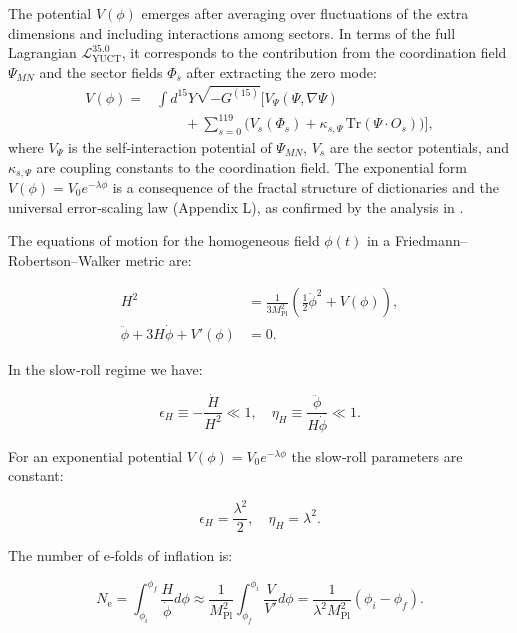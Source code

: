 \documentclass[12pt]{article}
\theoremstyle{remark}
\newcommand{\Mpl}{M_{\mathrm{Pl}}}
\newcommand{\ninf}{N_{\mathrm{e}}}
\begin{document}
	The potential $V(\phi)$ emerges after averaging over fluctuations of the extra dimensions and including interactions among sectors. In terms of the full Lagrangian $\mathcal{L}_{\text{YUCT}}^{35.0}$, it corresponds to the contribution from the coordination field $\Psi_{MN}$ and the sector fields $\Phi_s$ after extracting the zero mode:
	\begin{align}
		V(\phi) = &\int d^{15}Y \sqrt{-G^{(15)}} \Big[ V_{\Psi}(\Psi,\nabla\Psi) \nonumber\\
		&\qquad + \sum_{s=0}^{119} \big( V_s(\Phi_s) + \kappa_{s,\Psi}\,\mathrm{Tr}(\Psi\cdot O_s) \big) \Big],
	\end{align}
	where $V_{\Psi}$ is the self‑interaction potential of $\Psi_{MN}$, $V_s$ are the sector potentials, and $\kappa_{s,\Psi}$ are coupling constants to the coordination field. The exponential form $V(\phi)=V_0 e^{-\lambda\phi}$ is a consequence of the fractal structure of dictionaries and the universal error‑scaling law (Appendix L), as confirmed by the analysis in \cite{Yakushev2026}.
	
	The equations of motion for the homogeneous field $\phi(t)$ in a Friedmann–Robertson–Walker metric are:
	
	\begin{align}
		H^2 &= \frac{1}{3\Mpl^2} \left( \frac{1}{2}\dot{\phi}^2 + V(\phi) \right), \label{eq:friedman1} \\
		\ddot{\phi} + 3H\dot{\phi} + V'(\phi) &= 0. \label{eq:field}
	\end{align}
	
	In the slow‑roll regime we have:
	
	\begin{equation}
		\epsilon_H \equiv -\frac{\dot{H}}{H^2} \ll 1, \quad \eta_H \equiv \frac{\ddot{\phi}}{H\dot{\phi}} \ll 1.
	\end{equation}
	
	For an exponential potential $V(\phi) = V_0 e^{-\lambda \phi}$ the slow‑roll parameters are constant:
	
	\begin{equation}
		\epsilon_H = \frac{\lambda^2}{2}, \quad \eta_H = \lambda^2.
		\label{eq:slowroll}
	\end{equation}
	
	The number of e‑folds of inflation is:
	
	\begin{equation}
		\ninf = \int_{\phi_i}^{\phi_f} \frac{H}{\dot{\phi}} d\phi \approx \frac{1}{\Mpl^2} \int_{\phi_f}^{\phi_i} \frac{V}{V'} d\phi = \frac{1}{\lambda^2 \Mpl^2} (\phi_i - \phi_f).
	\end{equation}
	
\end{document}
